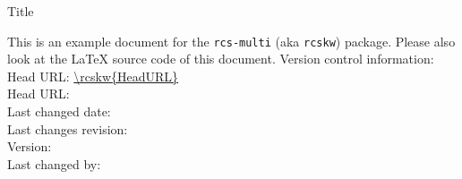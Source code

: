 \documentclass[12pt]{report}
\begin{document}
\begin{titlepage}
 \vspace{8ex}
 {\huge Title\par}
 \vspace{2ex}
 {\large \noindent This is an example document for the \texttt{rcs-multi} (aka
 \texttt{rcskw}) package. Please also look at the LaTeX source code of this
 document.}
 \vfill
 \flushleft\sffamily
 Version control information:\\
 Head URL: \url{\rcskw{HeadURL}}\\
 Head URL: \\
 Last changed date: \rcsdate\\
 Last changes revision: \rcsrev\\
 Version: \rcsFullRevision*{\rcsrev}\\
 Last changed by: \rcsFullAuthor*{\rcsauthor}\\
\end{titlepage}

\tableofcontents


%
%
\end{document}
